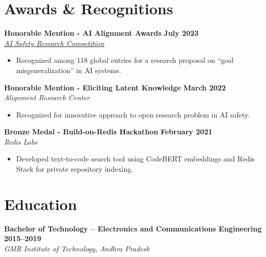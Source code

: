 \documentclass[11pt,a4paper]{article}
\newcommand{\entrygap}{\vspace{8pt}}
\begin{document}
\section{Awards \& Recognitions}

\textbf{Honorable Mention - AI Alignment Awards} \hfill \textbf{July 2023} \\
\textit{\href{https://www.lesswrong.com/posts/zFoAAD7dfWdczxoLH/winners-of-ai-alignment-awards-research-contest}{AI Safety Research Competition}}
\begin{itemize}[leftmargin=*, nosep]
\item Recognized among 118 global entries for a research proposal on ``goal misgeneralization'' in AI systems.
\end{itemize}

\entrygap
\textbf{Honorable Mention - Eliciting Latent Knowledge} \hfill \textbf{March 2022} \\
\textit{Alignment Research Center}
\begin{itemize}[leftmargin=*, nosep]
\item Recognized for innovative approach to open research problem in AI safety.
\end{itemize}

\entrygap
\textbf{Bronze Medal - Build-on-Redis Hackathon} \hfill \textbf{February 2021} \\
\textit{Redis Labs}
\begin{itemize}[leftmargin=*, nosep]
\item Developed text-to-code search tool using CodeBERT embeddings and Redis Stack for private repository indexing.
\end{itemize}

\section{Education}

\textbf{Bachelor of Technology -- Electronics and Communications Engineering} \hfill \textbf{2015--2019} \\
\textit{GMR Institute of Technology, Andhra Pradesh}
\end{document}

